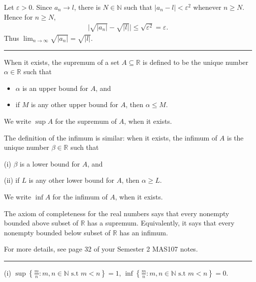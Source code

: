 \documentclass[letterpaper,10pt,english]{jupyterBook}
\begin{document}
\sphinxAtStartPar
Let \(\varepsilon>0\). Since \(a_n\rightarrow l\), there is \(N\in\mathbb{N}\) such that \(|a_n-l|<\varepsilon^2\) whenever \(n\geq N\). Hence for \(n\geq N\),
\begin{equation*}
\begin{split}
\big|\sqrt{|a_{n}|}-\sqrt{|l|}\big| \leq \sqrt{\varepsilon^2} = \varepsilon.
\end{split}
\end{equation*}
\sphinxAtStartPar
Thus \(\displaystyle\lim_{n\rightarrow\infty}\sqrt{|a_n|} = \sqrt{|l|}\).


\bigskip\hrule\bigskip


\sphinxAtStartPar
{\hyperref[\detokenize{Problems:p5}]{}} When it exists, the supremum of a set \(A\subseteq\mathbb{R}\) is defined to be the unique number \(\alpha\in\mathbb{R}\) such that
\begin{itemize}
\item {} 
\sphinxAtStartPar
\(\alpha\) is an upper bound for \(A\), and

\item {} 
\sphinxAtStartPar
if \(M\) is any other upper bound for \(A\), then \(\alpha\leq M\).

\end{itemize}

\sphinxAtStartPar
We write \(\sup A\) for the supremum of \(A\), when it exists.

\sphinxAtStartPar
The definition of the infimum is similar: when it exists, the infimum of \(A\) is the unique number \(\beta\in\mathbb{R}\) such that

\sphinxAtStartPar
(i) \(\beta\) is a lower bound for \(A\), and

\sphinxAtStartPar
(ii) if \(L\) is any other lower bound for \(A\), then \(\alpha\geq L\).

\sphinxAtStartPar
We write \(\inf A\) for the infimum of \(A\), when it exists.

\sphinxAtStartPar
The axiom of completeness for the real numbers says that every non\sphinxhyphen{}empty bounded above subset of \(\mathbb{R}\) has a supremum. Equivalently, it says that every non\sphinxhyphen{}empty bounded below subset of \(\mathbb{R}\) has an infimum.

\sphinxAtStartPar
For more details, see page 32 of your Semester 2 MAS107 notes.


\bigskip\hrule\bigskip


\sphinxAtStartPar
{\hyperref[\detokenize{Problems:p6}]{}}(i) \(\displaystyle\sup\left\{\frac{m}{n}:m,n\in\mathbb{N} \text{ s.t } m<n\right\}=1\), \(\displaystyle\inf\left\{\frac{m}{n}:m,n\in\mathbb{N} \text{ s.t } m<n\right\}=0\).
\end{document}
